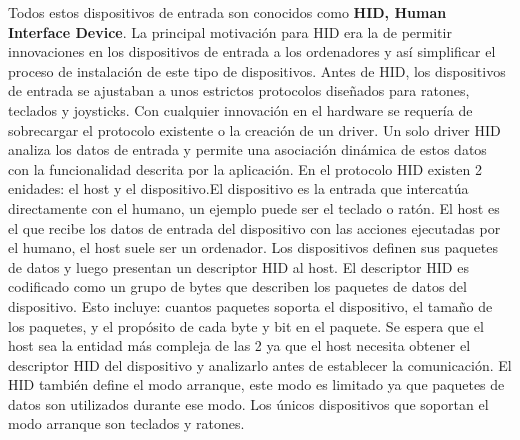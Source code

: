 Todos estos dispositivos de entrada son conocidos como \textbf{HID, Human Interface Device}. La principal motivaci\'on para HID era la de permitir innovaciones en los dispositivos de entrada a los ordenadores y as\'i simplificar el proceso de instalaci\'on de este tipo de dispositivos. Antes de HID, los dispositivos de entrada se ajustaban a unos estrictos protocolos dise\~nados para ratones, teclados y joysticks. Con cualquier innovaci\'on en el hardware se requer\'ia de sobrecargar el protocolo existente o la creaci\'on de un driver. Un solo driver HID analiza los datos de entrada y permite una asociaci\'on din\'amica de estos datos con la funcionalidad descrita por la aplicaci\'on. En el protocolo HID existen 2 enidades: el host y el dispositivo.El dispositivo es la entrada que intercat\'ua directamente con el humano, un ejemplo puede ser el teclado o rat\'on. El host es el que recibe los datos de entrada del dispositivo con las acciones ejecutadas por el humano, el host suele ser un ordenador.
 Los dispositivos definen sus paquetes de datos y luego presentan un descriptor HID al host. El descriptor HID es codificado como un grupo de bytes que describen los paquetes de datos del dispositivo. Esto incluye: cuantos paquetes soporta el dispositivo, el tama\~no de los paquetes, y el prop\'osito de cada byte y bit en el paquete. Se espera que el host sea la entidad m\'as compleja de las 2 ya que el host necesita obtener el descriptor HID del dispositivo y analizarlo antes de establecer la comunicaci\'on. El HID tambi\'en define el modo arranque, este modo es limitado ya que paquetes de datos son utilizados durante ese modo. Los \'unicos dispositivos que soportan el modo arranque son teclados y ratones.\par

